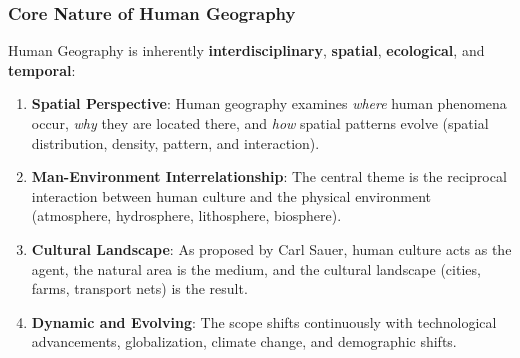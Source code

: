 \documentclass[11pt,a4paper]{article}
\begin{document}
\subsubsection{Core Nature of Human Geography}
Human Geography is inherently \textbf{interdisciplinary}, \textbf{spatial}, \textbf{ecological}, and \textbf{temporal}:
\begin{enumerate}[leftmargin=*]
  \item \textbf{Spatial Perspective}: Human geography examines \textit{where} human phenomena occur, \textit{why} they are located there, and \textit{how} spatial patterns evolve (spatial distribution, density, pattern, and interaction).
  \item \textbf{Man-Environment Interrelationship}: The central theme is the reciprocal interaction between human culture and the physical environment (atmosphere, hydrosphere, lithosphere, biosphere).
  \item \textbf{Cultural Landscape}: As proposed by Carl Sauer, human culture acts as the agent, the natural area is the medium, and the cultural landscape (cities, farms, transport nets) is the result.
  \item \textbf{Dynamic and Evolving}: The scope shifts continuously with technological advancements, globalization, climate change, and demographic shifts.
\end{enumerate}
\end{document}
